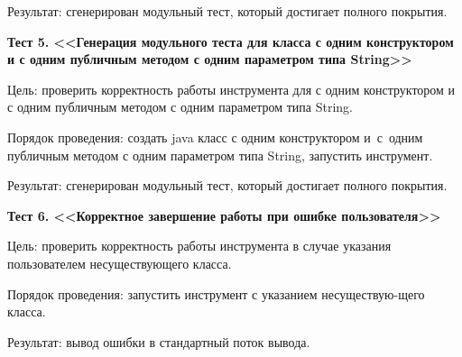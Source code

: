 Результат: сгенерирован модульный тест, который достигает полного покрытия.


\textbf{Тест 5. <<Генерация модульного теста для класса с одним конструктором и с одним публичным методом с одним параметром типа String>>}

Цель: проверить корректность работы инструмента для с одним конструктором и с одним публичным методом с одним параметром типа String.

Порядок проведения: создать java класс с одним конструктором и~с~одним публичным методом с одним параметром типа String, запустить инструмент.

Результат: сгенерирован модульный тест, который достигает полного покрытия.


\textbf{Тест 6. <<Корректное завершение работы при ошибке пользователя>>}

Цель: проверить корректность работы инструмента в случае указания пользователем несуществующего класса.

Порядок проведения: запустить инструмент с указанием несуществую-щего класса.

Результат: вывод ошибки в стандартный поток вывода.
